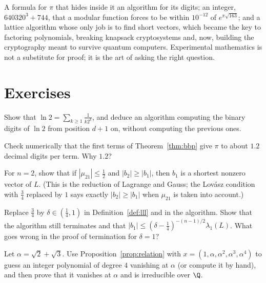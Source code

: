 \begin{beauty}
A formula for $\pi$ that hides inside it an algorithm for its digits; an integer, $640320^3+744$, that a modular function forces to be within $10^{-12}$ of $e^{\pi\sqrt{163}}$; and a
lattice algorithm whose only job is to find short vectors, which became the key to factoring polynomials, breaking knapsack cryptosystems and, now, building the cryptography
meant to survive quantum computers. Experimental mathematics is not a substitute for proof; it is the art of asking the right question.
\end{beauty}

\section{Exercises}

\begin{exercise}[$\star$]\label{ex:log2}
Show that $\ln2=\sum_{k\ge1}\frac1{k2^k}$, and deduce an algorithm computing the binary digits of $\ln2$ from position $d+1$ on, without computing the previous ones.
\end{exercise}

\begin{exercise}[$\star$]\label{ex:bbpcheck}
Check numerically that the first terms of Theorem~\ref{thm:bbp} give $\pi$ to about $1.2$ decimal digits per term. Why $1.2$?
\end{exercise}

\begin{exercise}[$\star\star$]\label{ex:gauss2}
For $n=2$, show that if $|\mu_{21}|\le\frac12$ and $|b_2|\ge|b_1|$, then $b_1$ is a shortest nonzero vector of $L$. (This is the reduction of Lagrange and Gauss; the Lov\'asz condition with $\frac34$
replaced by $1$ says exactly $|b_2|\ge|b_1|$ when $\mu_{21}$ is taken into account.)
\end{exercise}

\begin{exercise}[$\star\star$]\label{ex:delta}
Replace $\frac34$ by $\delta\in(\frac14,1)$ in Definition~\ref{def:lll} and in the algorithm. Show that the algorithm still terminates and that $|b_1|\le(\delta-\frac14)^{-(n-1)/2}\lambda_1(L)$. What goes wrong in the proof of termination
for $\delta=1$?
\end{exercise}

\begin{exercise}[$\star\star$]\label{ex:minpoly}
Let $\alpha=\sqrt2+\sqrt3$. Use Proposition~\ref{prop:relation} with $x=(1,\alpha,\alpha^2,\alpha^3,\alpha^4)$ to guess an integer polynomial of degree $4$ vanishing at $\alpha$ (or compute it by hand), and then prove
that it vanishes at $\alpha$ and is irreducible over $\Q$.
\end{exercise}

